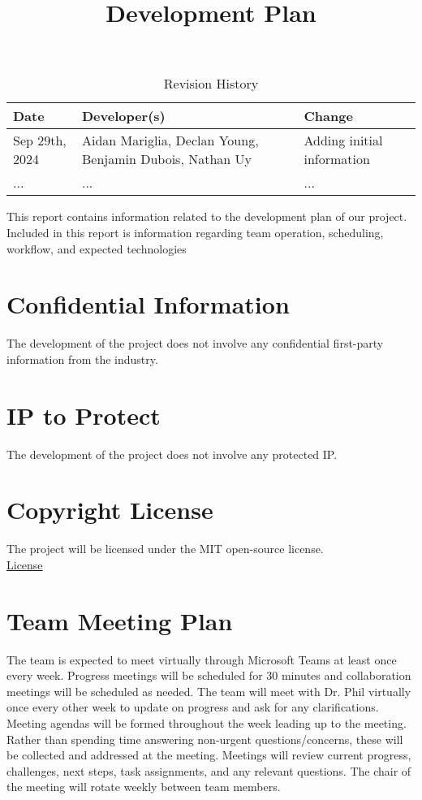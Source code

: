 \documentclass{article}
\title{Development Plan\\\progname}
\author{\authname}
\date{}
\begin{document}
\maketitle

\begin{table}[hp]
\caption{Revision History} \label{TblRevisionHistory}
\begin{tabularx}{\textwidth}{lp{5cm}X}
\toprule
\textbf{Date} & \textbf{Developer(s)} & \textbf{Change}\\
\midrule
Sep 29th, 2024 & Aidan Mariglia, Declan Young, Benjamin Dubois, Nathan Uy & Adding initial information\\
... & ... & ...\\
\bottomrule
\end{tabularx}
\end{table}

\newpage{}

This report contains information related to the development plan of our project. Included in this report is information regarding team operation, scheduling, workflow, and expected technologies

\section{Confidential Information}

The development of the project does not involve any confidential first-party information from the industry.

\section{IP to Protect}

The development of the project does not involve any protected IP.

\section{Copyright License}

The project will be licensed under the MIT open-source license. \\
\href{https://github.com/AidanMariglia/SOCAlgoTestPlatform/blob/main/LICENSE}{License}

\section{Team Meeting Plan}

The team is expected to meet virtually through Microsoft Teams at least once every week. Progress meetings will be scheduled for 30 minutes and collaboration meetings will be scheduled as needed. The team will meet with Dr. Phil virtually once every other week to update on progress and ask for any clarifications. Meeting agendas will be formed throughout the week leading up to the meeting. Rather than spending time answering non-urgent questions/concerns, these will be collected and addressed at the meeting. Meetings will review current progress, challenges, next steps, task assignments, and any relevant questions. The chair of the meeting will rotate weekly between team members.
\end{document}
